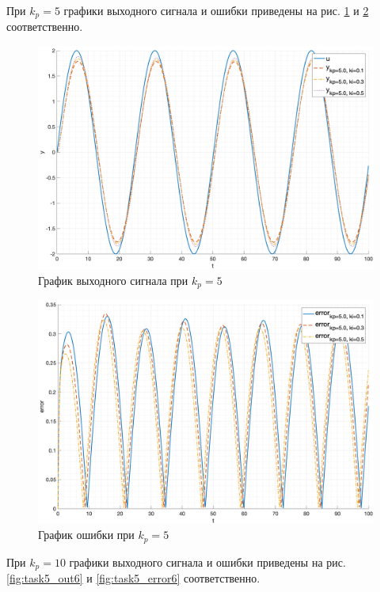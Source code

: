 При $k_p = 5$ графики выходного сигнала и ошибки приведены
на рис. \ref{fig:task5_out5} и \ref{fig:task5_error5} соответственно.

\begin{figure}[ht!]
    \centering
    \includegraphics[width=\textwidth]{media/plots/task5_out_kp_5.0_2.png}
    \caption{График выходного сигнала при $k_p = 5$}
    \label{fig:task5_out5}
\end{figure}

\begin{figure}[ht!]
    \centering
    \includegraphics[width=\textwidth]{media/plots/task5_error_kp_5.0_2.png}
    \caption{График ошибки при $k_p = 5$}
    \label{fig:task5_error5}
\end{figure}

При $k_p = 10$ графики выходного сигнала и ошибки приведены
на рис. \ref{fig:task5_out6} и \ref{fig:task5_error6} соответственно.

